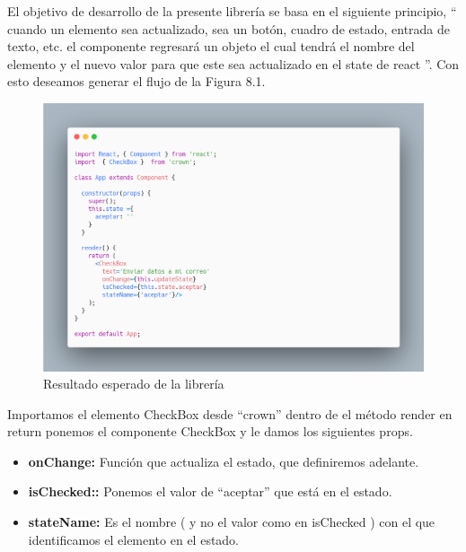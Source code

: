         El objetivo de desarrollo de la presente librería se basa en el siguiente principio, “ cuando un elemento sea actualizado, sea un botón, cuadro de estado, entrada de texto, etc. el componente regresará un objeto el cual tendrá el nombre del elemento y el nuevo valor para que este sea actualizado en el state de react ”.  Con esto deseamos generar el  flujo de la Figura 8.1.
        
               \begin{figure}[H]
           \includegraphics[width=1\textwidth]{./Imagenes/carbon-8.png}
           \caption[Resultado esperado de la librería]{Resultado esperado de la librería}
             \end{figure}
        
        Importamos el elemento CheckBox desde “crown” dentro de el método render en return  ponemos el componente CheckBox y le damos los  siguientes  props.
        
        \begin{itemize}
        	\item \textbf{onChange:} Función que actualiza el estado, que definiremos adelante.
        	\item \textbf{isChecked::} Ponemos el valor de “aceptar” que está en el estado.
        	\item \textbf{stateName:}  Es el nombre ( y no el valor como en isChecked ) con el que identificamos el elemento en el estado. 
        \end{itemize}
        
